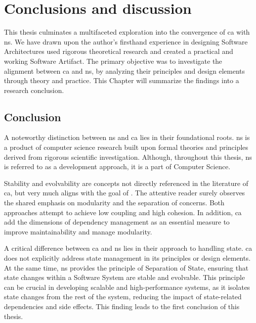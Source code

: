 \chapter{Conclusions and discussion} \label{chap_conclusions}

This thesis culminates a multifaceted exploration into the convergence of \gls{ca} with
\gls{ns}. We have drawn upon the author's firsthand experience in designing Software
Architectures used rigorous theoretical research and created a practical and working
Software Artifact. The primary objective was to investigate the alignment between \gls{ca}
and \gls{ns}, by analyzing their principles and design elements through theory and
practice. This Chapter will summarize the findings into a research conclusion.

\section{Conclusion}

A noteworthy distinction between \gls{ns} and \gls{ca} lies in their foundational roots.
\gls{ns} is a product of computer science research built upon formal theories and
principles derived from rigorous scientific investigation. Although, throughout this
thesis, \gls{ns} is referred to as a development approach, it is a part of Computer
Science.

Stability and evolvability are concepts not directly referenced in the literature of
\gls{ca}, but very much aligns with the goal of \textcite[31]{mannaert_normalized_2016}.
The attentive reader surely observes the shared emphasis on modularity and the separation
of concerns. Both approaches attempt to achieve low coupling and high cohesion. In
addition, \gls{ca} add the dimensions of dependency management as an essential measure to
improve maintainability and manage modularity. 

A critical difference between \gls{ca} and \gls{ns} lies in their approach to handling
state. \gls{ca} does not explicitly address state management in its principles or design
elements. At the same time, \gls{ns} provides the principle of Separation of State,
ensuring that state changes within a Software System are stable and evolvable. This
principle can be crucial in developing scalable and high-performance systems, as it
isolates state changes from the rest of the system, reducing the impact of state-related
dependencies and side effects. This finding leads to the first conclusion of this thesis. 

